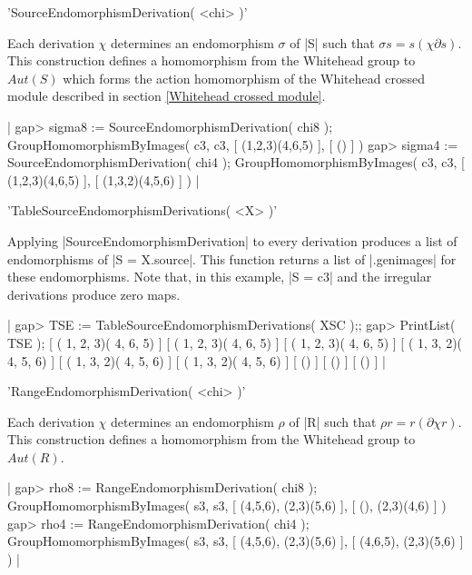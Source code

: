 'SourceEndomorphismDerivation( <chi> )'

Each derivation $\chi$ determines an endomorphism $\sigma$ of |S| such
that $\sigma  s = s (\chi  \partial s)$.  This construction  defines a
homomorphism   from the Whitehead group   to $Aut(S)$  which forms the
action  homomorphism of   the Whitehead crossed    module described in
section
\ref{Whitehead crossed module}.

|    gap> sigma8 := SourceEndomorphismDerivation( chi8 );
    GroupHomomorphismByImages( c3, c3, [ (1,2,3)(4,6,5) ], [ () ] )
    gap> sigma4 := SourceEndomorphismDerivation( chi4 );
    GroupHomomorphismByImages( c3, c3, [ (1,2,3)(4,6,5) ], 
       [ (1,3,2)(4,5,6) ] ) |

%

'TableSourceEndomorphismDerivations( <X> )'

Applying |SourceEndomorphismDerivation| to every derivation produces a
list of endomorphisms of |S = X.source|.  This function returns a list
of |.genimages| for these endomorphisms.  Note  that, in this example,
|S = c3| and the irregular derivations produce zero maps.

|    gap> TSE := TableSourceEndomorphismDerivations( XSC );;
    gap> PrintList( TSE );
    [ ( 1, 2, 3)( 4, 6, 5) ]
    [ ( 1, 2, 3)( 4, 6, 5) ]
    [ ( 1, 2, 3)( 4, 6, 5) ]
    [ ( 1, 3, 2)( 4, 5, 6) ]
    [ ( 1, 3, 2)( 4, 5, 6) ]
    [ ( 1, 3, 2)( 4, 5, 6) ]
    [ () ]
    [ () ]
    [ () ]  |

%

'RangeEndomorphismDerivation( <chi> )'

Each derivation  $\chi$ determines an  endomorphism $\rho$ of |R| such
that  $\rho r  = r (\partial  \chi  r)$.  This  construction defines a
homomorphism from the Whitehead group to $Aut(R)$.

|    gap> rho8 := RangeEndomorphismDerivation( chi8 );
    GroupHomomorphismByImages( s3, s3, [ (4,5,6), (2,3)(5,6) ], 
      [ (), (2,3)(4,6) ] )
    gap> rho4 := RangeEndomorphismDerivation( chi4 );
    GroupHomomorphismByImages( s3, s3, [ (4,5,6), (2,3)(5,6) ], 
      [ (4,6,5), (2,3)(5,6) ] )   |

%

